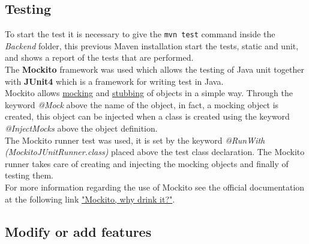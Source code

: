 \subsection{Testing}	
To start the test it is necessary to give the \texttt{mvn test} command 	inside the \textit{Backend} folder, this previous Maven installation start the tests, static and unit, and shows a report of the tests that are performed.\\
The \textbf{Mockito} framework was used which allows the testing of Java unit together with \textbf{JUnit4} which is a framework for writing test in Java.\\
Mockito allows \href{https://en.wikipedia.org/wiki/Mock_object}{mocking} and \href{https://en.wikipedia.org/wiki/Method_stub}{stubbing} of objects  in a simple way. Through the keyword \textit{@Mock} above the name of the object, in fact, a mocking object is created, this object can be injected when a class is created using the keyword \textit{@InjectMocks} above the object definition.\\
The Mockito runner test was used, it is set by the keyword \textit{@RunWith (MockitoJUnitRunner.class)} placed above the test class declaration.
The Mockito runner takes care of creating and injecting the mocking objects and finally of testing them.\\
For more information regarding the use of Mockito see the official documentation at the following link \href{https://site.mockito.org/}{"Mockito, why drink it?"}.

\subsection{Modify or add features}
